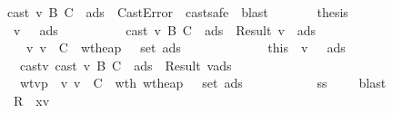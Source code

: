 \begin{isabellebody}
\ \ \ \ \ \ \ \ cast\ v\ B\ C\ {\isasymmu}\ ads\ {\isacharequal}\ CastError{\isachardoublequoteclose}\ \isamarkupfalse \ cast{\isacharunderscore}safe\ \isamarkupfalse \ blast\isanewline
\ \ \ \ \ \ \isamarkupfalse \ {\isacharquery}thesis\isanewline
\ \ \ \ \ \ \isamarkupfalse \isanewline
\ \ \ \ \ \ \ \ \isamarkupfalse \ {\isachardoublequoteopen}{\isacharparenleft}{\isasymexists}v{\isacharprime}\ {\isasymSigma}{\isacharprime}\ {\isasymmu}{\isacharprime}\ ads{}{\isachardot}\isanewline
\ \ \ \ \ \ \ \ \ \ cast\ v\ B\ C\ {\isasymmu}\ ads\ {\isacharequal}\ Result\ {\isacharparenleft}v{\isacharprime}{\isacharcomma}\ {\isasymmu}{\isacharprime}{\isacharcomma}\ ads{}{\isacharparenright}\ {\isasymand}\isanewline
\ \ \ \ \ \ \ \ \ \ {\isasymSigma}{\isacharprime}\ {\isasymturnstile}v\ v{\isacharprime}\ {\isacharcolon}\ C\ {\isasymand}\ wt{\isacharunderscore}heap\ {\isasymSigma}{\isacharprime}\ {\isasymmu}{\isacharprime}\ {\isacharparenleft}set\ ads{}{\isacharparenright}\ {\isasymand}\ {\isasymSigma}{\isacharprime}\ {\isasymsqsubseteq}\ {\isasymSigma}{\isacharparenright}{\isachardoublequoteclose}\isanewline
\ \ \ \ \ \ \ \ \isamarkupfalse \ this\ \isamarkupfalse \ v{\isacharprime}\ {\isasymSigma}{\isacharprime}\ {\isasymmu}{\isacharprime}\ ads{}\ \isanewline
\ \ \ \ \ \ \ \ \ \ castv{\isacharcolon}\ {\isachardoublequoteopen}cast\ v\ B\ C\ {\isasymmu}\ ads\ {\isacharequal}\ Result\ {\isacharparenleft}v{\isacharprime}{\isacharcomma}{\isasymmu}{\isacharprime}{\isacharcomma}ads{}{\isacharparenright}{\isachardoublequoteclose}\ \isanewline
\ \ \ \ \ \ \ \ \ \ wtvp{\isacharcolon}\ {\isachardoublequoteopen}{\isasymSigma}{\isacharprime}\ {\isasymturnstile}v\ v{\isacharprime}\ {\isacharcolon}\ C{\isachardoublequoteclose}\ \ wth{}{\isacharcolon}\ {\isachardoublequoteopen}wt{\isacharunderscore}heap\ {\isasymSigma}{\isacharprime}\ {\isasymmu}{\isacharprime}\ {\isacharparenleft}set\ ads{}{\isacharparenright}{\isachardoublequoteclose}\ \isanewline
\ \ \ \ \ \ \ \ \ \ ss{\isacharcolon}\ {\isachardoublequoteopen}{\isasymSigma}{\isacharprime}\ {\isasymsqsubseteq}\ {\isasymSigma}{\isachardoublequoteclose}\ \isamarkupfalse \ blast\isanewline
\ \ \ \ \ \ \ \ \isamarkupfalse \ {\isacharquery}R{}\ {\isacharequal}\ {\isachardoublequoteopen}{\isacharparenleft}x{\isacharcomma}v{\isacharprime}{\isacharparenright}{\isacharhash}{\isasymrho}{\isachardoublequoteclose}\isanewline

\end{isabellebody}
